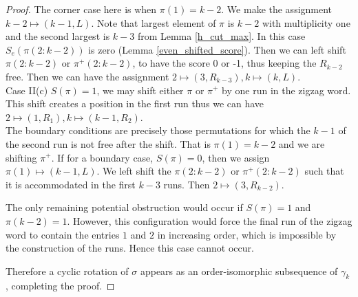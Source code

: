 \documentclass[a4paper,12pt]{article}
\theoremstyle{definition}
\numberwithin{equation}{section}
\begin{document}
\begin{proof}
The corner case here is when $\pi(1) = k-2$. We make the assignment $k-2 \mapsto (k-1,L)$. Note that largest element of $\pi$ is $k-2$ with multiplicity one and the second largest is $k-3$ from Lemma \ref{h_cut_max}. In this case $S_e(\pi(2:k-2))$ is zero (Lemma \ref{even_shifted_score}). Then we can left shift $\pi(2:k-2)$ or $\pi^+(2:k-2)$, to have the score 0 or -1, thus keeping the $R_{k-2}$ free. Then we can have the assignment $2 \mapsto (3,R_{k-3}), k \mapsto (k,L)$. \\
Case II(c) $S(\pi) = 1$, 
 we may shift either $\pi$ or
$\pi^{+}$ by one run in the zigzag word. This shift creates a position
in the first run thus we can have $2 \mapsto (1,R_1),  k \mapsto (k-1,R_2) $. \\
The boundary conditions are precisely those permutations for which the $k-1$ of the second run is not free after the shift. That is $\pi(1) = k-2$ and we are shifting $\pi^+$. 
If for a boundary case, $S(\pi)=0$, then we assign $\pi(1) \mapsto (k-1,L)$. We left shift the $\pi(2:k-2)$ or $\pi^+(2:k-2)$ such that it is accommodated in the first $k-3$ runs. Then $2 \mapsto (3,R_{k-2})$. 

The only remaining potential obstruction would occur if $S(\pi)=1$ and
$\pi(k-2)=1$. However, this configuration would force the final run of
the zigzag word to contain the entries $1$ and $2$ in increasing order,
which is impossible by the construction of the runs. Hence this case
cannot occur.

Therefore a cyclic rotation of $\sigma$ appears as an order-isomorphic
subsequence of $\gamma_k$, completing the proof.
\end{proof}
\end{document}
